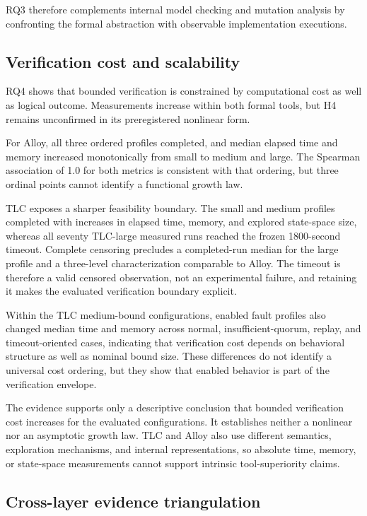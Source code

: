 RQ3 therefore complements internal model checking and mutation analysis by
confronting the formal abstraction with observable implementation executions.

\subsection{Verification cost and scalability}
\label{subsec:discussion-cost}

RQ4 shows that bounded verification is constrained by computational cost as
well as logical outcome. Measurements increase within both formal tools, but
H4 remains unconfirmed in its preregistered nonlinear form.

For Alloy, all three ordered profiles completed, and median elapsed time and
memory increased monotonically from small to medium and large. The Spearman
association of 1.0 for both metrics is consistent with that ordering, but three
ordinal points cannot identify a functional growth law.

TLC exposes a sharper feasibility boundary. The small and medium profiles
completed with increases in elapsed time, memory, and explored state-space size,
whereas all seventy TLC-large measured runs reached the frozen 1800-second
timeout. Complete censoring precludes a completed-run median for the large
profile and a three-level characterization comparable to Alloy. The timeout is
therefore a valid censored observation, not an experimental failure, and
retaining it makes the evaluated verification boundary explicit.

Within the TLC medium-bound configurations, enabled fault profiles also changed
median time and memory across normal, insufficient-quorum, replay, and
timeout-oriented cases, indicating that verification cost depends on behavioral
structure as well as nominal bound size. These differences do not identify a
universal cost ordering, but they show that enabled behavior is part of the
verification envelope.

The evidence supports only a descriptive conclusion that bounded verification
cost increases for the evaluated configurations. It establishes neither a
nonlinear nor an asymptotic growth law. TLC and Alloy also use different
semantics, exploration mechanisms, and internal representations, so absolute
time, memory, or state-space measurements cannot support intrinsic
tool-superiority claims.

\subsection{Cross-layer evidence triangulation}
\label{subsec:discussion-triangulation}

